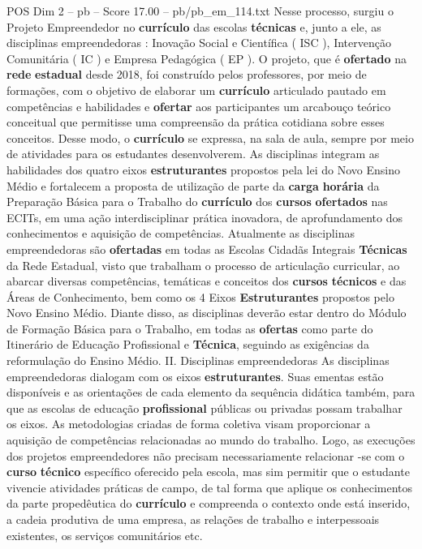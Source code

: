 \begin{textsample}{POS Dim 2 – pb – Score 17.00 – pb/pb\_em\_114.txt}
Nesse processo, surgiu o Projeto Empreendedor no \textbf{currículo} das escolas \textbf{técnicas} e, junto a ele, as disciplinas empreendedoras : Inovação Social e Científica ( ISC ), Intervenção Comunitária ( IC ) e Empresa Pedagógica ( EP ).
O projeto, que é \textbf{ofertado} na \textbf{rede} \textbf{estadual} desde 2018, foi construído pelos professores, por meio de formações, com o objetivo de elaborar um \textbf{currículo} articulado pautado em competências e habilidades e \textbf{ofertar} aos participantes um arcabouço teórico conceitual que permitisse uma compreensão da prática cotidiana sobre esses conceitos.
Desse modo, o \textbf{currículo} se expressa, na sala de aula, sempre por meio de atividades para os estudantes desenvolverem.
As disciplinas integram as habilidades dos quatro eixos \textbf{estruturantes} propostos pela lei do Novo Ensino Médio e fortalecem a proposta de utilização de parte da \textbf{carga} \textbf{horária} da Preparação Básica para o Trabalho do \textbf{currículo} dos \textbf{cursos} \textbf{ofertados} nas ECITs, em uma ação interdisciplinar prática inovadora, de aprofundamento dos conhecimentos e aquisição de competências.
Atualmente as disciplinas empreendedoras são \textbf{ofertadas} em todas as Escolas Cidadãs Integrais \textbf{Técnicas} da Rede Estadual, visto que trabalham o processo de articulação curricular, ao abarcar diversas competências, temáticas e conceitos dos \textbf{cursos} \textbf{técnicos} e das Áreas de Conhecimento, bem como os 4 Eixos \textbf{Estruturantes} propostos pelo Novo Ensino Médio.
Diante disso, as disciplinas deverão estar dentro do Módulo de Formação Básica para o Trabalho, em todas as \textbf{ofertas} como parte do Itinerário de Educação Profissional e \textbf{Técnica}, seguindo as exigências da reformulação do Ensino Médio.
II.
Disciplinas empreendedoras As disciplinas empreendedoras dialogam com os eixos \textbf{estruturantes}.
Suas ementas estão disponíveis e as orientações de cada elemento da sequência didática também, para que as escolas de educação \textbf{profissional} públicas ou privadas possam trabalhar os eixos.
As metodologias criadas de forma coletiva visam proporcionar a aquisição de competências relacionadas ao mundo do trabalho.
Logo, as execuções dos projetos empreendedores não precisam necessariamente relacionar -se com o \textbf{curso} \textbf{técnico} específico oferecido pela escola, mas sim permitir que o estudante vivencie atividades práticas de campo, de tal forma que aplique os conhecimentos da parte propedêutica do \textbf{currículo} e compreenda o contexto onde está inserido, a cadeia produtiva de uma empresa, as relações de trabalho e interpessoais existentes, os serviços comunitários etc.

\end{textsample}
